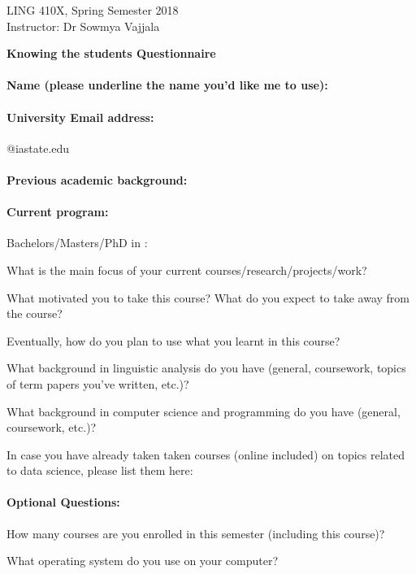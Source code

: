 \documentclass{article}
\begin{document}
LING 410X, Spring Semester 2018 \\ Instructor: Dr Sowmya Vajjala

\bigskip
  \mbox{}\hfill \textbf{Knowing the students Questionnaire} \hfill \mbox{}

\smallskip

\doublespacing
\paragraph{Name \textmd{(please underline the name you'd like me to use)}:}

\singlespacing 

\paragraph{University Email address:}  \hspace{3cm}@iastate.edu

\paragraph{Previous academic background:}


\paragraph{Current program:} Bachelors/Masters/PhD in : 
\singlespacing 

What is the main focus of your current courses/research/projects/work?

\vspace{1cm}

What motivated you to take this course?  What do you expect to take away from the course? 

\vspace{1cm}


Eventually, how do you plan to use what you learnt in this course?

\vspace{1cm}

What background in linguistic analysis do you have (general,
coursework, topics of term papers you've written, etc.)?  

\vspace{1cm}

What background in computer science and programming
do you have (general, coursework, etc.)?

\vspace{1cm}

In case you have already taken taken courses (online included) on topics related
to data science, please list them here:

\vspace{1cm}

\paragraph{Optional Questions:}
How many courses are you enrolled in this semester (including this course)? 

\vspace{1cm}

What operating system do you use on your computer? 
\vspace{1cm}
\end{document}
